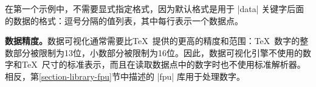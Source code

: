 \begin{codeexample}[preamble={\usetikzlibrary{datavisualization.formats.functions}}]
\end{codeexample}


在第一个示例中，不需要显式指定格式，因为默认格式是用于 |data| 关键字后面的数据的格式：逗号分隔的值列表，其中每行表示一个数据点。

\medskip

\textbf{数据精度。}\label{section-dv-expressions}数据可视化通常需要比\TeX\ 提供的更高的精度和范围：\TeX\ 数字的整数部分被限制为13位，小数部分被限制为16位。因此，数据可视化引擎不使用\pgfname 的数字和\TeX\ 尺寸的标准表示，而且在读取数据点中的数字时也不使用标准解析器。相反，第\ref{section-library-fpu}节中描述的 |fpu| 库用于处理数字。


